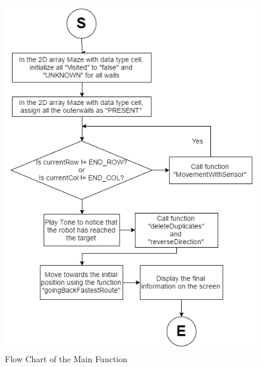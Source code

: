 \documentclass[11pt]{article}
\begin{document}
\begin{figure}[htp]
\centering
\includegraphics[scale=0.7]{images/Software_Flowchart/task_main.png}
\caption{Flow Chart of the Main Function}
\label{}
\end{figure}
\newpage


\end{document}
